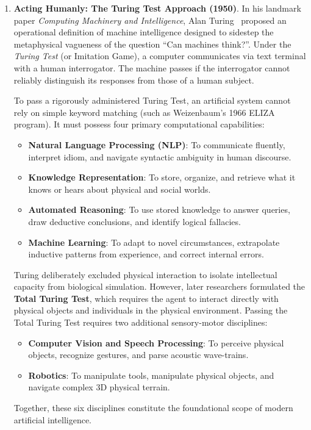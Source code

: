 \begin{enumerate}
  \item \textbf{Acting Humanly: The Turing Test Approach (1950)}.
  In his landmark paper \emph{Computing Machinery and Intelligence}, Alan Turing~\cite{turing1950computing} proposed an operational definition of machine intelligence designed to sidestep the metaphysical vagueness of the question ``Can machines think?''. Under the \emph{Turing Test} (or Imitation Game), a computer communicates via text terminal with a human interrogator. The machine passes if the interrogator cannot reliably distinguish its responses from those of a human subject.
  
  To pass a rigorously administered Turing Test, an artificial system cannot rely on simple keyword matching (such as Weizenbaum's 1966 ELIZA program). It must possess four primary computational capabilities:
  \begin{itemize}[noitemsep]
    \item \textbf{Natural Language Processing (NLP)}: To communicate fluently, interpret idiom, and navigate syntactic ambiguity in human discourse.
    \item \textbf{Knowledge Representation}: To store, organize, and retrieve what it knows or hears about physical and social worlds.
    \item \textbf{Automated Reasoning}: To use stored knowledge to answer queries, draw deductive conclusions, and identify logical fallacies.
    \item \textbf{Machine Learning}: To adapt to novel circumstances, extrapolate inductive patterns from experience, and correct internal errors.
  \end{itemize}
  Turing deliberately excluded physical interaction to isolate intellectual capacity from biological simulation. However, later researchers formulated the \textbf{Total Turing Test}, which requires the agent to interact directly with physical objects and individuals in the physical environment. Passing the Total Turing Test requires two additional sensory-motor disciplines:
  \begin{itemize}[noitemsep]
    \item \textbf{Computer Vision and Speech Processing}: To perceive physical objects, recognize gestures, and parse acoustic wave-trains.
    \item \textbf{Robotics}: To manipulate tools, manipulate physical objects, and navigate complex 3D physical terrain.
  \end{itemize}
  Together, these six disciplines constitute the foundational scope of modern artificial intelligence. 
  

\end{enumerate}
